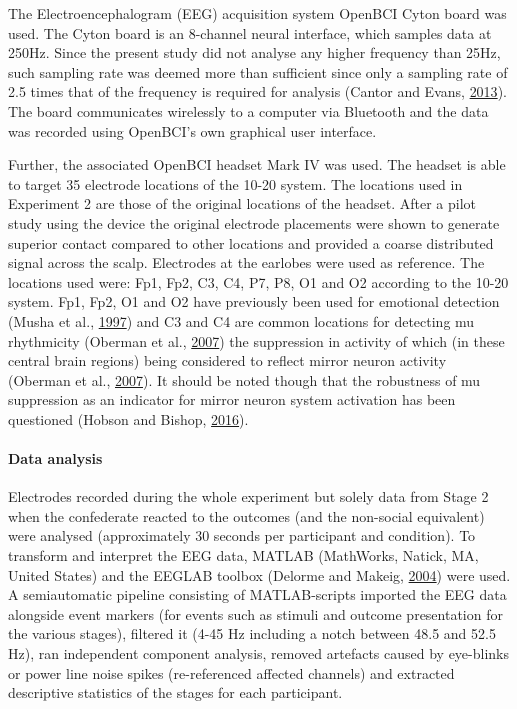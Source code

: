 \documentclass[]{elsarticle} %
\begin{document}
The Electroencephalogram (EEG) acquisition system OpenBCI Cyton board
was used. The Cyton board is an 8-channel neural interface, which
samples data at 250Hz. Since the present study did not analyse any
higher frequency than 25Hz, such sampling rate was deemed more than
sufficient since only a sampling rate of 2.5 times that of the frequency
is required for analysis (Cantor and Evans,
\protect\hyperlink{ref-cantor2013clinical}{2013}). The board
communicates wirelessly to a computer via Bluetooth and the data was
recorded using OpenBCI's own graphical user interface.

Further, the associated OpenBCI headset Mark IV was used. The headset is
able to target 35 electrode locations of the 10-20 system. The locations
used in Experiment 2 are those of the original locations of the headset.
After a pilot study using the device the original electrode placements
were shown to generate superior contact compared to other locations and
provided a coarse distributed signal across the scalp. Electrodes at the
earlobes were used as reference. The locations used were: Fp1, Fp2, C3,
C4, P7, P8, O1 and O2 according to the 10-20 system. Fp1, Fp2, O1 and O2
have previously been used for emotional detection (Musha et al.,
\protect\hyperlink{ref-musha1997feature}{1997}) and C3 and C4 are common
locations for detecting mu rhythmicity (Oberman et al.,
\protect\hyperlink{ref-oberman2007human}{2007}) the suppression in
activity of which (in these central brain regions) being considered to
reflect mirror neuron activity (Oberman et al.,
\protect\hyperlink{ref-oberman2007human}{2007}). It should be noted
though that the robustness of mu suppression as an indicator for mirror
neuron system activation has been questioned (Hobson and Bishop,
\protect\hyperlink{ref-hobson2016mu}{2016}).

\hypertarget{data-analysis}{%
\paragraph{Data analysis}\label{data-analysis}}

Electrodes recorded during the whole experiment but solely data from
Stage 2 when the confederate reacted to the outcomes (and the non-social
equivalent) were analysed (approximately 30 seconds per participant and
condition). To transform and interpret the EEG data, MATLAB (MathWorks,
Natick, MA, United States) and the EEGLAB toolbox (Delorme and Makeig,
\protect\hyperlink{ref-delorme2004eeglab}{2004}) were used. A
semiautomatic pipeline consisting of MATLAB-scripts imported the EEG
data alongside event markers (for events such as stimuli and outcome
presentation for the various stages), filtered it (4-45 Hz including a
notch between 48.5 and 52.5 Hz), ran independent component analysis,
removed artefacts caused by eye-blinks or power line noise spikes
(re-referenced affected channels) and extracted descriptive statistics
of the stages for each participant.
\end{document}
